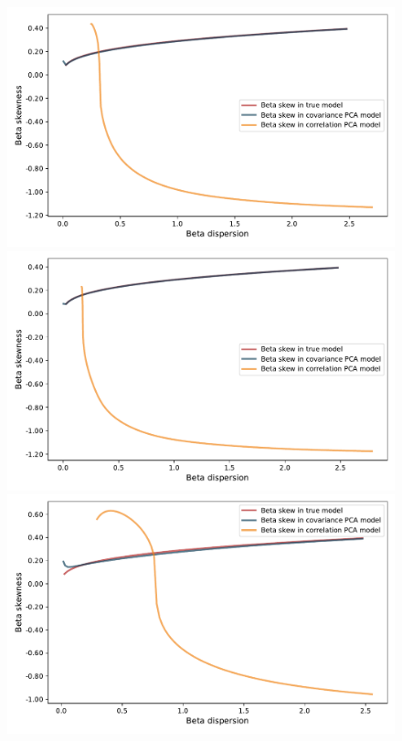 \documentclass[leqno,12pt]{article}
\begin{document}
{\begin{figure}[htp]
\begin{center}
  \includegraphics[scale=0.33]{img/DispersionvsSkew1factorsN512T256fvol16minsvol10maxsvol40}
  \includegraphics[scale=0.33]{img/DispersionvsSkew1factorsN512T256fvol25minsvol10maxsvol40}
  \includegraphics[scale=0.33]{img/DispersionvsSkew1factorsN512T256fvol16minsvol30maxsvol90}

\end{center}
\end{figure}}
\end{document}
